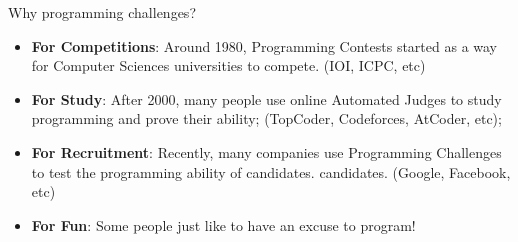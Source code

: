 \begin{frame}{Why programming challenges?}
  \begin{itemize}
    \item {\bf For Competitions}: Around 1980, Programming Contests started as a way for Computer Sciences universities to compete. (IOI, ICPC, etc)
    \bigskip

    \item {\bf For Study}: After 2000, many people use online Automated Judges to study programming and prove their ability; (TopCoder, Codeforces, AtCoder, etc);
    \bigskip

    \item {\bf For Recruitment}: Recently, many companies use Programming Challenges to test the programming ability of candidates. candidates. (Google, Facebook, etc)\bigskip

    \item {\bf For Fun}: Some people just like to have an excuse to program!
  \end{itemize}
\end{frame}

